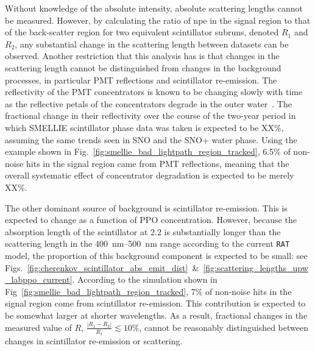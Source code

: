 Without knowledge of the absolute intensity, absolute scattering lengths cannot be measured. However, by calculating the ratio of npe in the signal region to that of the back-scatter region for two equivalent scintillator subruns, denoted $R_{1}$ and $R_{2}$, any substantial change in the scattering length between datasets can be observed. Another restriction that this analysis has is that changes in the scattering length cannot be distinguished from changes in the background processes, in particular PMT reflections and scintillator re-emission. The reflectivity of the PMT concentrators is known to be changing slowly with time as the reflective petals of the concentrators degrade in the outer water~\cite{}. %
The fractional change in their reflectivity over the course of the two-year period in which SMELLIE scintillator phase data was taken is expected to be XX\%, %
assuming the same trends seen in SNO and the SNO+ water phase. Using the example shown in Fig.~\ref{fig:smellie_bad_lightpath_region_tracked}, 6.5\% of non-noise hits in the signal region came from PMT reflections, meaning that the overall systematic effect of concentrator degradation is expected to be merely XX\%. %
 
The other dominant source of background is scintillator re-emission. This is expected to change as a function of PPO concentration. However, because the absorption length of the scintillator at \SI{2.2}{\gpl} is substantially longer than the scattering length in the \SIrange{400}{500}{\nm} range according to the current \texttt{RAT} model, the proportion of this background component is expected to be small: see Figs.~\ref{fig:cherenkov_scintillator_abs_emit_dist}~\&~\ref{fig:scattering_lengths_upw_labppo_current}. According to the simulation shown in Fig~\ref{fig:smellie_bad_lightpath_region_tracked}, 7\% of non-noise hits in the signal region come from scintillator re-emission. This contribution is expected to be somewhat larger at shorter wavelengths. As a result, fractional changes in the measured value of $R$, $\frac{\left|R_{1}-R_{2}\right|}{R_{1}}\lesssim 10\%$, cannot be reasonably distinguished between changes in scintillator re-emission or scattering.

